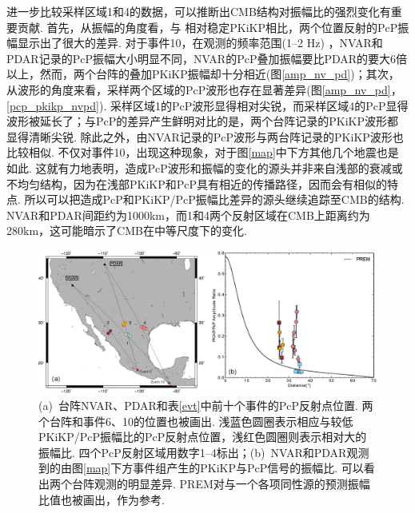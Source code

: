 进一步比较采样区域1和4的数据，可以推断出CMB结构对振幅比的强烈变化有重要贡献. 首先，从振幅的角度看，与
相对稳定PKiKP相比，两个位置反射的PcP振幅显示出了很大的差异. 对于事件10，在观测的频率范围(1--2 Hz) ，NVAR和PDAR记录的PcP振幅大小明显不同，NVAR的PcP叠加振幅要比PDAR的要大6倍以上，然而，两个台阵的叠加PKiKP振幅却十分相近(图\ref{amp_nv_pd})；其次，从波形的角度来看，采样两个区域的PcP波形也存在显著差异(图\ref{amp_nv_pd}，\ref{pcp_pkikp_nvpd}). 采样区域1的PcP波形显得相对尖锐，而采样区域4的PcP显得波形被延长了；与PcP的差异产生鲜明对比的是，两个台阵记录的PKiKP波形都显得清晰尖锐. 除此之外，由NVAR记录的PcP波形与两台阵记录的PKiKP波形也比较相似. 不仅对事件10，出现这种现象，对于图\ref{map}中下方其他几个地震也是如此. 这就有力地表明，造成PcP波形和振幅的变化的源头并非来自浅部的衰减或不均匀结构，因为在浅部PKiKP和PcP具有相近的传播路径，因而会有相似的特点. 所以可以把造成PcP和PKiKP/PcP振幅比差异的源头继续追踪至CMB的结构. NVAR和PDAR间距约为1000km，而1和4两个反射区域在CMB上距离约为280km，这可能暗示了CMB在中等尺度下的变化. 

\begin{figure}
\centering
\includegraphics[width=\linewidth]{fig/chap3/evt_bp_us.eps}
\caption{(a)~台阵NVAR、PDAR和表\ref{evt}中前十个事件的PcP反射点位置. 两个台阵和事件6、10的位置也被画出. 浅蓝色圆圈表示相应与较低PKiKP/PcP振幅比的PcP反射点位置，浅红色圆圈则表示相对大的振幅比. 四个PcP反射区域用数字1--4标出；(b)~NVAR和PDAR观测到的由图\ref{map}下方事件组产生的PKiKP与PcP信号的振幅比. 可以看出两个台阵观测的明显差异. PREM对与一个各项同性源的预测振幅比值也被画出，作为参考. }
\label{ratio_loc}
\end{figure}

